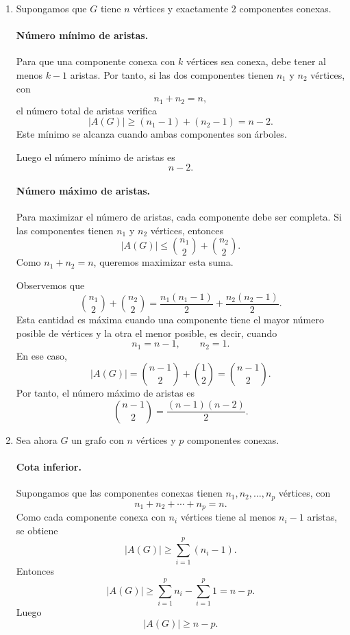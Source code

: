 \documentclass[12pt]{article}
\begin{document}
\begin{enumerate}
    \item Supongamos que \(G\) tiene \(n\) vértices y exactamente \(2\) componentes conexas.

    \paragraph{Número mínimo de aristas.}
    Para que una componente conexa con \(k\) vértices sea conexa, debe tener al menos \(k-1\) aristas. Por tanto, si las dos componentes tienen \(n_1\) y \(n_2\) vértices, con
    \[
    n_1+n_2=n,
    \]
    el número total de aristas verifica
    \[
    |A(G)|\ge (n_1-1)+(n_2-1)=n-2.
    \]
    Este mínimo se alcanza cuando ambas componentes son árboles.

    Luego el número mínimo de aristas es
    \[
    \boxed{n-2.}
    \]

    \paragraph{Número máximo de aristas.}
    Para maximizar el número de aristas, cada componente debe ser completa. Si las componentes tienen \(n_1\) y \(n_2\) vértices, entonces
    \[
    |A(G)|\le \binom{n_1}{2}+\binom{n_2}{2}.
    \]
    Como \(n_1+n_2=n\), queremos maximizar esta suma.

    Observemos que
    \[
    \binom{n_1}{2}+\binom{n_2}{2}
    =\frac{n_1(n_1-1)}{2}+\frac{n_2(n_2-1)}{2}.
    \]
    Esta cantidad es máxima cuando una componente tiene el mayor número posible de vértices y la otra el menor posible, es decir, cuando
    \[
    n_1=n-1,\qquad n_2=1.
    \]
    En ese caso,
    \[
    |A(G)|=\binom{n-1}{2}+\binom{1}{2}=\binom{n-1}{2}.
    \]
    Por tanto, el número máximo de aristas es
    \[
    \boxed{\binom{n-1}{2}=\frac{(n-1)(n-2)}{2}.}
    \]

    \item Sea ahora \(G\) un grafo con \(n\) vértices y \(p\) componentes conexas.

    \paragraph{Cota inferior.}
    Supongamos que las componentes conexas tienen \(n_1,n_2,\dots,n_p\) vértices, con
    \[
    n_1+n_2+\cdots+n_p=n.
    \]
    Como cada componente conexa con \(n_i\) vértices tiene al menos \(n_i-1\) aristas, se obtiene
    \[
    |A(G)|\ge \sum_{i=1}^p (n_i-1).
    \]
    Entonces
    \[
    |A(G)|\ge \sum_{i=1}^p n_i-\sum_{i=1}^p 1
    =n-p.
    \]
    Luego
    \[
    \boxed{|A(G)|\ge n-p.}
    \]


\end{enumerate}
\end{document}
